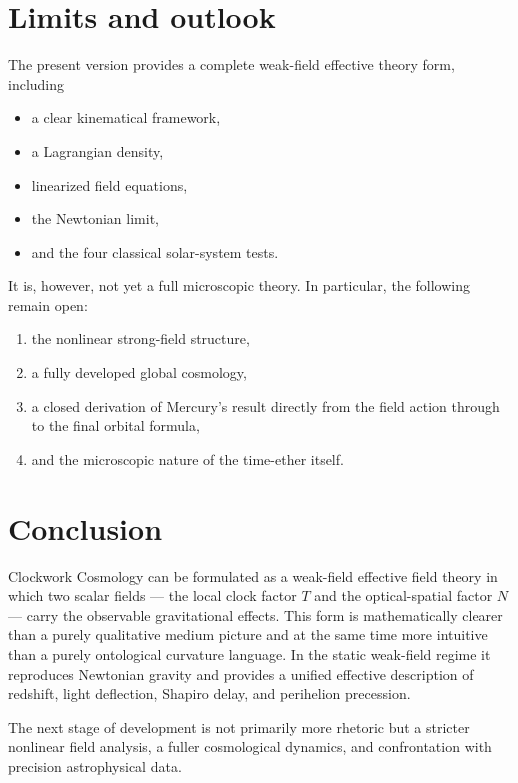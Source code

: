 \documentclass[11pt,a4paper]{article}
\begin{document}
\section{Limits and outlook}
The present version provides a complete weak-field effective theory form, including
\begin{itemize}
    \item a clear kinematical framework,
    \item a Lagrangian density,
    \item linearized field equations,
    \item the Newtonian limit,
    \item and the four classical solar-system tests.
\end{itemize}
It is, however, not yet a full microscopic theory. In particular, the following remain open:
\begin{enumerate}[label=\arabic*.]
    \item the nonlinear strong-field structure,
    \item a fully developed global cosmology,
    \item a closed derivation of Mercury's result directly from the field action through to the final orbital formula,
    \item and the microscopic nature of the time-ether itself.
\end{enumerate}

\section{Conclusion}
Clockwork Cosmology can be formulated as a weak-field effective field theory in which two scalar fields --- the local clock factor $T$ and the optical-spatial factor $N$ --- carry the observable gravitational effects. This form is mathematically clearer than a purely qualitative medium picture and at the same time more intuitive than a purely ontological curvature language. In the static weak-field regime it reproduces Newtonian gravity and provides a unified effective description of redshift, light deflection, Shapiro delay, and perihelion precession.

The next stage of development is not primarily more rhetoric but a stricter nonlinear field analysis, a fuller cosmological dynamics, and confrontation with precision astrophysical data.



\end{document}
